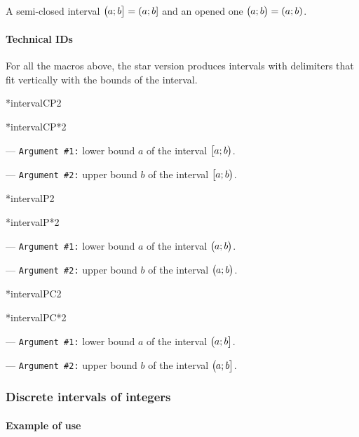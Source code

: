 \documentclass[12pt,a4paper]{article}
\makeatletter
\newcommand\IDmacro{\@ifstar{\@IDmacroStar}{\@IDmacroNoStar}}
\newcommand\@IDmacroNoStar[3]{%
        \texttt{%
        	\textbackslash#1%
        	\IfStrEq{#2}{0}{}{%
        		\,\,[#2 Option%
				\IfStrEq{#2}{1}{}{s}]%
			}%
    	    \,\,(#3 Argument%
				\IfStrEq{#3}{1}{}{s})%
	   	}
        \immediate\write\tempfile{macro@#1@#2@#3}%
    }
\newcommand\@IDmacroStar[2]{%
        \@IDmacroNoStar{#1}{0}{#2}%
    }
\newcommand\@IDoptarg[2]{%
    	\vspace{0.5em}
		--- \texttt{#1 \##2:}%
	}
\newcommand\IDarg[1]{%
    	\@IDoptarg{Argument}{#1}%
	}
\makeatother
\begin{document}
\begin{tcblisting}{}
A semi-closed interval $\intervalPC{a}{b} = (a ; b]$ and an opened one
$\intervalP{a}{b} = (a ; b)$.

\end{tcblisting}


		\paragraph{Technical IDs}

For all the macros above, the star version produces intervals with delimiters that fit vertically with the bounds of the interval.

\medskip


\medskip

\IDmacro*{intervalCP}{2}

\IDmacro*{intervalCP*}{2}

\IDarg{1} lower bound $a$ of the interval $\intervalCP{a}{b}$.

\IDarg{2} upper bound $b$ of the interval $\intervalCP{a}{b}$.

\medskip

\IDmacro*{intervalP}{2}

\IDmacro*{intervalP*}{2}

\IDarg{1} lower bound $a$ of the interval $\intervalP{a}{b}$.

\IDarg{2} upper bound $b$ of the interval $\intervalP{a}{b}$.

\medskip

\IDmacro*{intervalPC}{2}

\IDmacro*{intervalPC*}{2}

\IDarg{1} lower bound $a$ of the interval $\intervalPC{a}{b}$.

\IDarg{2} upper bound $b$ of the interval $\intervalPC{a}{b}$.




    \subsubsection{Discrete intervals of integers}

		\paragraph{Example of use}
\end{document}
